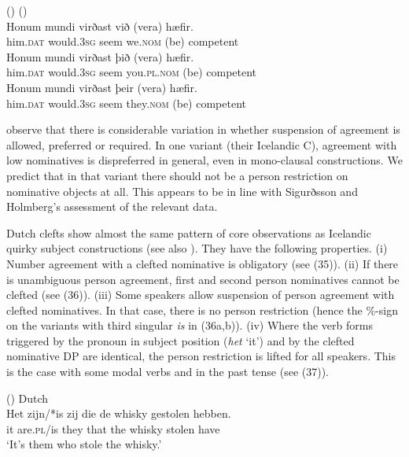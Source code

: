 \documentclass[output=paper]{langsci/langscibook}
\begin{document}
\ea (\label{bkm:Ref295483205})  (\citealt{Sigurðsson2008})\\
 \ea \gll  Honum  mundi        virðast við         (vera) hæfir.\\
 him.\textsc{dat} would.3\textsc{sg} seem    we.\textsc{nom} (be)    competent   \\
  \ex \gll  Honum  mundi       virðast þið               (vera) hæfir.\\
  him.\textsc{dat} would.3\textsc{sg} seem   you.\textsc{pl.nom} (be)    competent\\
  \ex \gll  Honum  mundi       virðast þeir          (vera) hæfir.\\
  him.\textsc{dat} would.3\textsc{sg} seem   they.\textsc{nom} (be)    competent\\
\z
\z

\citet{Sigurðsson2008} observe that there is considerable variation in whether suspension of agreement is allowed, preferred or required. In one variant (their Icelandic C), agreement with low nominatives is dispreferred in general, even in mono-clausal constructions. We predict that in that variant there should not be a person restriction on nominative objects at all. This appears to be in line with Sigurðsson and Holmberg’s assessment of the relevant data.

Dutch clefts show almost the same pattern of core observations as Icelandic quirky subject constructions (see also \citealt{Dikken2014}). They have the following properties. (i) Number agreement with a clefted nominative is obligatory (see (35)). (ii) If there is unambiguous person agreement, first and second person nominatives cannot be clefted (see (36)). (iii) Some speakers allow suspension of person agreement with clefted nominatives. In that case, there is no person restriction (hence the \%-sign on the variants with third singular \textit{is} in (36a,b)). (iv) Where the verb forms triggered by the pronoun in subject position (\textit{het} ‘it’) and by the clefted nominative DP are identical, the person restriction is lifted for all speakers. This is the case with some modal verbs and in the past tense (see (37)).

\ea (\label{bkm:Ref295486016})  Dutch\\
 \gll Het zijn/*is   zij   die   de whisky gestolen hebben.\\
    it    are.\textsc{pl}/is they that the whisky stolen     have\\
\glt   ‘It’s them who stole the whisky.’  
\z
\end{document}

